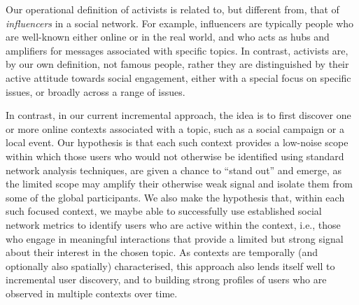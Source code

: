 \documentclass[runningheads]{llncs}
\begin{document}


Our operational definition of activists is related to, but different from, that of \textit{influencers} in a social network. 
For example, influencers are typically people who are well-known either online or in the real world, and who acts as hubs and amplifiers for messages associated with specific topics. 
In contrast, activists are, by our own definition, not famous people, rather they are distinguished by their active attitude towards social engagement, either with a special focus on specific issues, or broadly across a range of issues.



In contrast, in our current incremental approach, the idea is to first discover one or more online contexts associated with a topic, such as a social campaign or a local event.
Our hypothesis is that each such  context provides a low-noise scope within which those users who would not otherwise be identified using standard network analysis techniques, are given a chance to ``stand out'' and emerge, as the limited scope may amplify their otherwise weak signal and isolate them from some of the global participants.
We also make the hypothesis that, within each such focused context, we maybe able to  successfully use established social network metrics to identify users who are active within the context, i.e., those who engage in meaningful interactions that provide a limited but strong signal about their interest in the chosen topic. 
%
As contexts are temporally (and optionally also spatially) characterised, this approach also lends itself well to incremental user discovery,  and to building strong profiles of users who are observed in multiple contexts over time.
\end{document}
